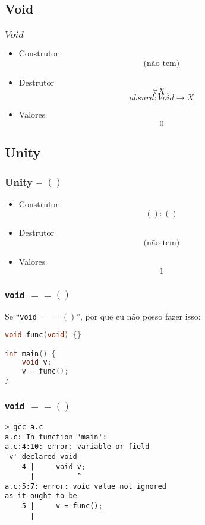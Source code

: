 \documentclass{beamer}
\newcommand{\inlcode}[1]{\texttt{#1}}
\renewcommand{\d}{\:.\:}
\begin{document}
\subsection{Void}
\begin{frame}
    \frametitle{\(Void\)}
    \pause
    \begin{itemize}
        \item Construtor
            \[
                \text{(não tem)}
            \]
            \vfill
        \item Destrutor
            \[
                \forall X \d
            \] \[
                absurd : Void \to X
            \]
            \vfill
        \item Valores
            \[
                0
            \]
    \end{itemize}
\end{frame}

\subsection{Unity}
\begin{frame}
    \frametitle{Unity -- \(()\)}
    \begin{itemize}
        \item Construtor
            \[
                () : ()
            \]
            \vfill
        \item Destrutor
            \[
                \text{(não tem)}
            \]
            \vfill
        \item Valores
            \[
                1
            \]
    \end{itemize}
\end{frame}

\begin{frame}[fragile]
    \frametitle{\inlcode{void} \(== ()\)}
    Se ``\inlcode{void} \(== ()\)'',
    por que eu não posso fazer isso:
    \vfill
    \begin{lstlisting}[language=C]
void func(void) {}

int main() {
    void v;
    v = func();
}
    \end{lstlisting}
\end{frame}

\begin{frame}[fragile]
    \frametitle{\inlcode{void} \(== ()\)}
    \begin{lstlisting}
> gcc a.c
a.c: In function 'main':
a.c:4:10: error: variable or field
'v' declared void
    4 |     void v;
      |          ^
a.c:5:7: error: void value not ignored
as it ought to be
    5 |     v = func();
      |
    \end{lstlisting}
\end{frame}
\end{document}
